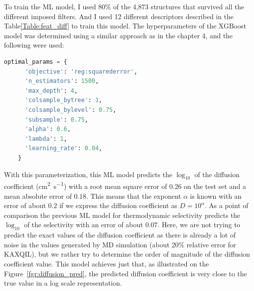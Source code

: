 \documentclass[main]{subfiles}
\begin{document}
To train the ML model, I used {80\%} of the 4,873 structures that survived all the different imposed filters. And I used 12 different descriptors described in the Table\ref{Table:feat_diff} to train this model. The hyperparameters of the XGBoost model was determined using a similar approach as in the chapter 4, and the following were used:

\begin{lstlisting}[language=Python]
  optimal_params = {
      'objective': 'reg:squarederror',
      'n_estimators': 1500,
      'max_depth': 4,
      'colsample_bytree': 1,
      'colsample_bylevel': 0.75,
      'subsample': 0.75,
      'alpha': 0.6,
      'lambda': 1,
      'learning_rate': 0.04,
    }
\end{lstlisting}

With this parameterization, this ML model predicts the $\log_{10}$ of the diffusion coefficient (\si{\square\cm\per\s}) with a root mean square error of $0.26$ on the test set and a mean absolute error of $0.18$. This means that the exponent $\alpha$ is known with an error of about $0.2$ if we express the diffusion coefficient as $D = 10^{\alpha}$. As a point of comparison the previous ML model for thermodynamic selectivity predicts the $\log_{10}$ of the selectivity with an error of about $0.07$. Here, we are not trying to predict the exact values of the diffusion coefficient as there is already a lot of noise in the values generated by MD simulation (about {20\% relative error for KAXQIL}), but we rather try to determine the order of magnitude of the diffusion coefficient value. This model achieves just that, as illustrated on the Figure~\ref{fgr:diffusion_pred}, the predicted diffusion coefficient is very close to the true value in a log scale representation.
\end{document}
